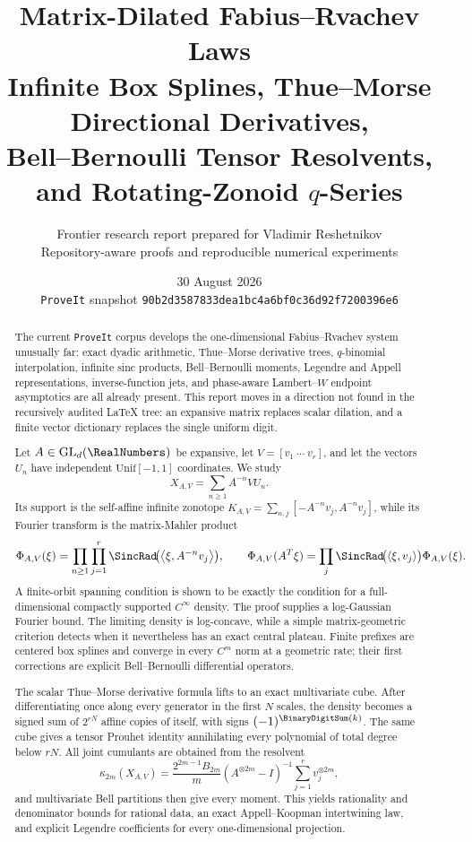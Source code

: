 \documentclass[11pt,oneside]{article}
\title{\bfseries Matrix-Dilated Fabius--Rvachev Laws\\[0.35em]
\Large Infinite Box Splines, Thue--Morse Directional Derivatives,\\
Bell--Bernoulli Tensor Resolvents, and Rotating-Zonoid $q$-Series}
\author{Frontier research report prepared for Vladimir Reshetnikov\\
\small Repository-aware proofs and reproducible numerical experiments}
\date{30 August 2026\\
\small \texttt{ProveIt} snapshot \texttt{90b2d3587833dea1bc4a6bf0c36d92f7200396e6}}
\theoremstyle{definition}
\theoremstyle{remark}
\newcommand{\ip}[2]{\left\langle #1,#2\right\rangle}
\begin{document}
\maketitle

\begin{abstract}
The current \texttt{ProveIt} corpus develops the one-dimensional Fabius--Rvachev
system unusually far: exact dyadic arithmetic, Thue--Morse derivative trees,
$q$-binomial interpolation, infinite sinc products, Bell--Bernoulli moments,
Legendre and Appell representations, inverse-function jets, and phase-aware
Lambert--$W$ endpoint asymptotics are all already present.  This report moves in
a direction not found in the recursively audited LaTeX tree: an expansive matrix
replaces scalar dilation, and a finite vector dictionary replaces the single
uniform digit.

Let $A\in\mathrm{GL}_d(\RealNumbers)$ be expansive, let
$V=[v_1\ \cdots\ v_r]$, and let the vectors $U_n$ have independent
$\mathrm{Unif}[-1,1]$ coordinates.  We study
\[
 X_{A,V}=\sum_{n\ge1}A^{-n}VU_n.
\]
Its support is the self-affine infinite zonotope
$K_{A,V}=\sum_{n,j}[-A^{-n}v_j,A^{-n}v_j]$, while its Fourier transform is the
matrix-Mahler product
\[
 \Phi_{A,V}(\xi)=\prod_{n\ge1}\prod_{j=1}^r
 \SincRad\!\bigl(\ip{\xi}{A^{-n}v_j}\bigr),
 \qquad
 \Phi_{A,V}(A^T\xi)=\prod_j\SincRad\!\bigl(\ip{\xi}{v_j}\bigr)\Phi_{A,V}(\xi).
\]
A finite-orbit spanning condition is shown to be exactly the condition for a
full-dimensional compactly supported $C^\infty$ density.  The proof supplies a
log-Gaussian Fourier bound.  The limiting density is log-concave, while a simple
matrix-geometric criterion detects when it nevertheless has an exact central
plateau.  Finite prefixes are centered box splines and converge in every $C^m$
norm at a geometric rate; their first corrections are explicit Bell--Bernoulli
differential operators.

The scalar Thue--Morse derivative formula lifts to an exact multivariate cube.
After differentiating once along every generator in the first $N$ scales, the
density becomes a signed sum of $2^{rN}$ affine copies of itself, with signs
$(-1)^{\BinaryDigitSum(k)}$.  The same cube gives a tensor Prouhet identity annihilating every
polynomial of total degree below $rN$.  All joint cumulants are obtained from the
resolvent
\[
 \kappa_{2m}(X_{A,V})=
 \frac{2^{2m-1}B_{2m}}{m}
 (A^{\otimes 2m}-I)^{-1}\sum_{j=1}^r v_j^{\otimes 2m},
\]
and multivariate Bell partitions then give every moment.  This yields rationality
and denominator bounds for rational data, an exact Appell--Koopman intertwining
law, and explicit Legendre coefficients for every one-dimensional projection.


\end{abstract}
\end{document}

